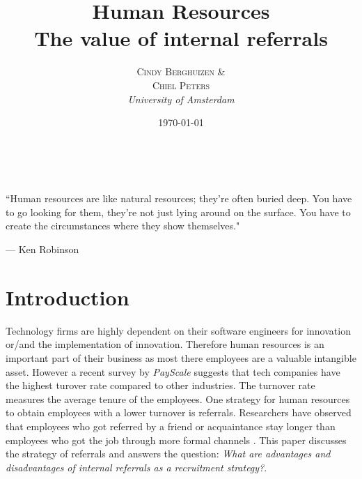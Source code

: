 \documentclass[a4paper, 11pt]{article} %
\title{\textbf{Human Resources}\\ %
The value of internal referrals} %
\author{\textsc{Cindy Berghuizen \& \\ Chiel Peters} %
\\{\textit{University of Amsterdam}}} %
\date{\today} %
\makeatletter
\renewcommand{\maketitle}{ %
\begin{flushright} %
{\LARGE\@title} %

\vspace{50pt} %

{\large\@author} %
\\\@date %

\vspace{20pt} %
\end{flushright}
}
\makeatother
\begin{document}
\maketitle %



\epigraph{``Human resources are like natural resources; they're often buried deep. You have to go looking for them, they're not just lying around on the surface. You have to create the circumstances where they show themselves."}{--- \textup{Ken Robinson}}

\begin{abstract}
\end{abstract}


\vspace{30pt} %


\section*{Introduction}


Technology firms are highly dependent on their software engineers for innovation or/and the implementation of innovation. Therefore human resources is an important part of their business as most there employees are a valuable intangible asset. However a recent survey by \textit{PayScale} \cite{turnover} suggests that tech companies have the highest turover rate compared to other industries. The turnover rate measures the average tenure of the employees. One strategy for human resources to obtain employees with a lower turnover is referrals. Researchers have observed that employees who got referred by a friend or acquaintance stay longer than employees who got the job through more formal channels \cite{sixth,ten}. This paper discusses the strategy of referrals and answers the question: \emph{What are advantages and disadvantages of internal referrals as a recruitment strategy?}. \\
\end{document}
